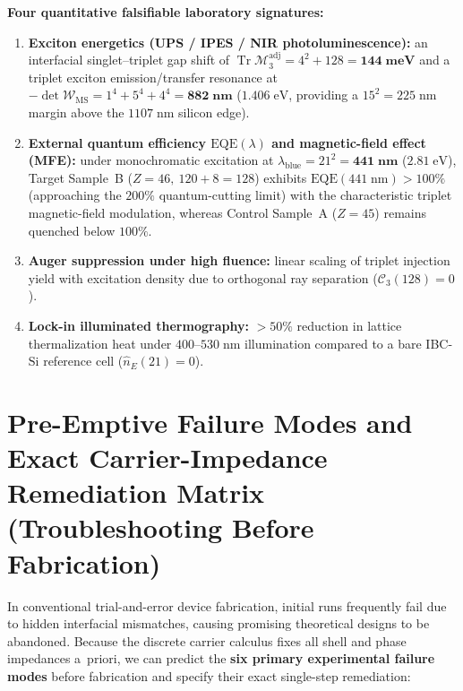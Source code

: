 \documentclass[11pt,a4paper]{article}
\theoremstyle{plain}
\theoremstyle{definition}
\begin{document}
\noindent\textbf{Four quantitative falsifiable laboratory signatures:}
\begin{enumerate}[label=\textbf{(M\arabic*)},leftmargin=*,noitemsep]
\item \textbf{Exciton energetics (UPS / IPES / NIR photoluminescence):} an interfacial singlet--triplet gap shift of $\operatorname{Tr}\mathcal{M}_3^{\mathrm{adj}} = 4^2 + 128 = \mathbf{144\;\text{meV}}$ and a triplet exciton emission/transfer resonance at $-\det\mathcal{W}_{\mathrm{MS}} = 1^4 + 5^4 + 4^4 = \mathbf{882\;\text{nm}}$ ($1.406\;\text{eV}$, providing a $15^2 = 225\;\text{nm}$ margin above the $1107\;\text{nm}$ silicon edge).
\item \textbf{External quantum efficiency $\mathrm{EQE}(\lambda)$ and magnetic-field effect (MFE):} under monochromatic excitation at $\lambda_{\mathrm{blue}} = 21^2 = \mathbf{441\;\text{nm}}$ ($2.81\;\text{eV}$), Target Sample~B ($Z=46,\ 120+8=128$) exhibits $\mathrm{EQE}(441\;\text{nm}) > 100\%$ (approaching the $200\%$ quantum-cutting limit) with the characteristic triplet magnetic-field modulation, whereas Control Sample~A ($Z=45$) remains quenched below $100\%$.
\item \textbf{Auger suppression under high fluence:} linear scaling of triplet injection yield with excitation density due to orthogonal ray separation ($\mathcal{C}_3(128) = 0$).
\item \textbf{Lock-in illuminated thermography:} $>50\%$ reduction in lattice thermalization heat under $400\text{--}530\;\text{nm}$ illumination compared to a bare IBC-$\mathrm{Si}$ reference cell ($\hat{n}_E(21) = 0$).
\end{enumerate}

\section{Pre-Emptive Failure Modes and Exact Carrier-Impedance Remediation Matrix (Troubleshooting Before Fabrication)}
\label{sec:remediation-matrix}

In conventional trial-and-error device fabrication, initial runs frequently fail due to hidden interfacial mismatches, causing promising theoretical designs to be abandoned. Because the discrete carrier calculus fixes all shell and phase impedances a~priori, we can predict the \textbf{six primary experimental failure modes} before fabrication and specify their exact single-step remediation:
\end{document}
